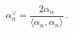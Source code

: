 \begin{equation}
\label {coroot}
  \alpha_n^\vee=\frac{2\alpha_n} {\langle\alpha_n,\alpha_n
\rangle}\, .
\end{equation}

